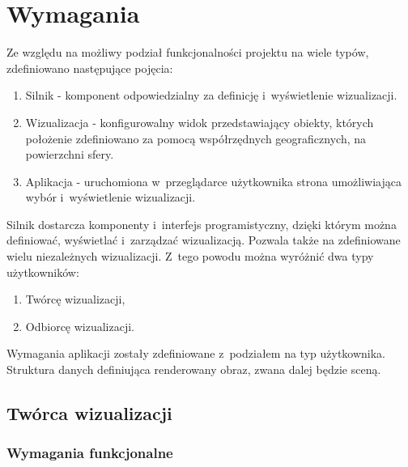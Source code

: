\chapter{Wymagania}

Ze względu na możliwy podział funkcjonalności projektu na wiele typów, zdefiniowano następujące pojęcia:
\begin{enumerate}
    \item Silnik - komponent odpowiedzialny za definicję i~wyświetlenie wizualizacji.
    \item Wizualizacja - konfigurowalny widok przedstawiający obiekty, których położenie zdefiniowano za pomocą współrzędnych geograficznych, na powierzchni sfery.
    \item Aplikacja - uruchomiona w~przeglądarce użytkownika strona umożliwiająca wybór i~wyświetlenie wizualizacji.
\end{enumerate} 

Silnik dostarcza komponenty i~interfejs programistyczny, dzięki którym można definiować, wyświetlać i~zarządzać wizualizacją.
Pozwala także na zdefiniowane wielu niezależnych wizualizacji. Z~tego powodu można wyróżnić dwa typy użytkowników:

\begin{enumerate}
    \item Twórcę wizualizacji,
    \item Odbiorcę wizualizacji.
\end{enumerate}

Wymagania aplikacji zostały zdefiniowane z~podziałem na typ użytkownika.
Struktura danych definiująca renderowany obraz, zwana dalej będzie sceną.

\newcommand{\req}[3]{
    \stepcounter{#2}
    #1\_\arabic{#2} & #3 \\
    \hline
}

\section{Twórca wizualizacji}

\subsection{Wymagania funkcjonalne}


